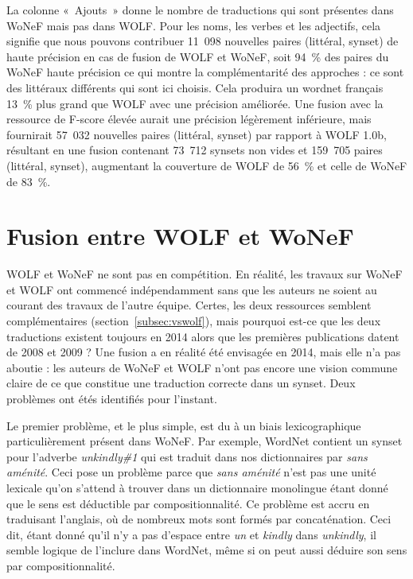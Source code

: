 La colonne «~Ajouts~» donne le nombre de traductions qui sont présentes dans
WoNeF mais pas dans WOLF. Pour les noms, les verbes et les adjectifs, cela
signifie que nous pouvons contribuer 11~098 nouvelles paires (littéral, synset)
de haute précision en cas de fusion de WOLF et WoNeF, soit 94~\% des paires du
WoNeF haute précision ce qui montre la complémentarité des approches : ce sont
des littéraux différents qui sont ici choisis. Cela produira un wordnet
français 13~\% plus grand que WOLF avec une précision améliorée. Une fusion
avec la ressource de F-score élevée aurait une précision légèrement inférieure,
mais fournirait 57~032 nouvelles paires (littéral, synset) par rapport à WOLF
1.0b, résultant en une fusion contenant 73~712 synsets non vides et 159~705
paires (littéral, synset), augmentant la couverture de WOLF de 56~\% et celle
de WoNeF de 83~\%.

\section{Fusion entre WOLF et WoNeF}

WOLF et WoNeF ne sont pas en compétition. En réalité, les travaux sur WoNeF et
WOLF ont commencé indépendamment sans que les auteurs ne soient au courant des
travaux de l'autre équipe. Certes, les deux ressources semblent complémentaires
(section~\ref{subsec:vswolf}), mais pourquoi est-ce que les deux traductions 
existent toujours en 2014 alors que les premières publications datent de 2008
et 2009 ?  Une fusion a en réalité été envisagée en 2014, mais elle n'a pas
aboutie : les auteurs de WoNeF et WOLF n'ont pas encore une vision commune
claire de ce que constitue une traduction correcte dans un synset. Deux
problèmes ont étés identifiés pour l'instant.

Le premier problème, et le plus simple, est du à un biais lexicographique
particulièrement présent dans WoNeF. Par exemple, WordNet contient un synset
pour l'adverbe \textit{unkindly\#1} qui est traduit dans nos dictionnaires par
\textit{sans aménité}. Ceci pose un problème parce que \textit{sans aménité}
n'est pas une unité lexicale qu'on s'attend à trouver dans un dictionnaire
monolingue étant donné que le sens est déductible par compositionnalité. Ce
problème est accru en traduisant l'anglais, où de nombreux mots sont formés par
concaténation. Ceci dit, étant donné qu'il n'y a pas d'espace entre \textit{un}
et \textit{kindly} dans \textit{unkindly}, il semble logique de l'inclure dans
WordNet, même si on peut aussi déduire son sens par compositionnalité.

